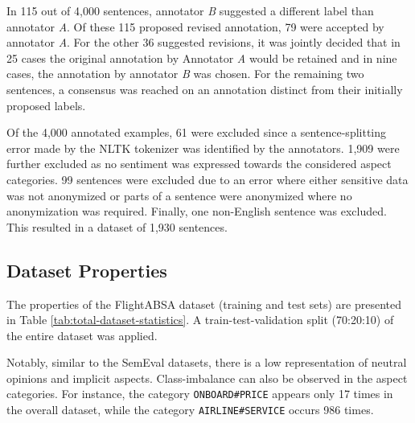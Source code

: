 In 115 out of 4,000 sentences, annotator \textit{B} suggested a different label than annotator \textit{A}. Of these 115 proposed revised annotation, 79 were accepted by annotator \textit{A}. For the other 36 suggested revisions, it was jointly decided that in 25 cases the original annotation by Annotator \textit{A} would be retained and in nine cases, the annotation by annotator \textit{B} was chosen. For the remaining two sentences, a consensus was reached on an annotation distinct from their initially proposed labels.

Of the 4,000 annotated examples, 61 were excluded since a sentence-splitting error made by the NLTK tokenizer was identified by the annotators. 1,909 were further excluded as no sentiment was expressed towards the considered aspect categories. 99 sentences were excluded due to an error where either sensitive data was not anonymized or parts of a sentence were anonymized where no anonymization was required. Finally, one non-English sentence was excluded. This resulted in a dataset of 1,930 sentences. 


\subsection{Dataset Properties}

The properties of the FlightABSA dataset (training and test sets) are presented in Table \ref{tab:total-dataset-statistics}. A train-test-validation split (70:20:10) of the entire dataset was applied. %

Notably, similar to the SemEval datasets, there is a low representation of neutral opinions and implicit aspects. Class-imbalance can also be observed in the aspect categories. For instance, the category \texttt{ONBOARD\#PRICE} appears only 17 times in the overall dataset, while the category \texttt{AIRLINE\#SERVICE} occurs 986 times.






